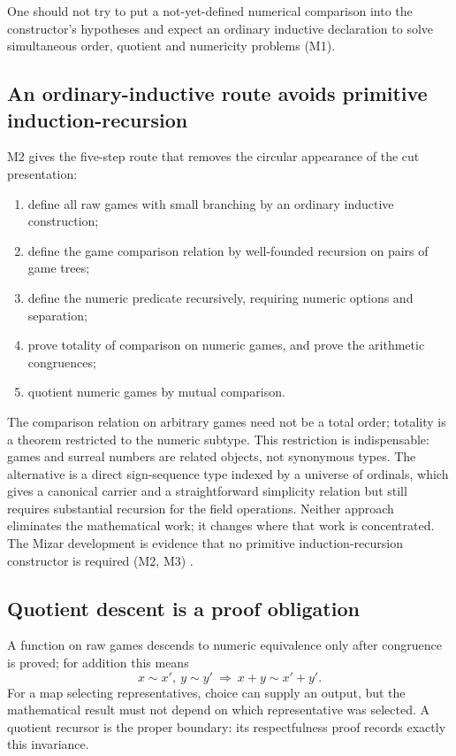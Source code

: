 \documentclass[11pt,letterpaper]{article}
\numberwithin{equation}{section}
\theoremstyle{definition}
\theoremstyle{remark}
\begin{document}
One should not try to put a not-yet-defined numerical comparison into the
constructor's hypotheses and expect an ordinary inductive declaration to solve
simultaneous order, quotient and numericity problems (M1).

\subsection{An ordinary-inductive route avoids primitive induction-recursion}
\label{found:sub:fivestep}
M2 gives the five-step route that removes the circular appearance of the cut
presentation:
\begin{enumerate}
\item define all raw games with small branching by an ordinary inductive
construction;
\item define the game comparison relation by well-founded recursion on pairs of
game trees;
\item define the numeric predicate recursively, requiring numeric options and
separation;
\item prove totality of comparison on numeric games, and prove the arithmetic
congruences;
\item quotient numeric games by mutual comparison.
\end{enumerate}
The comparison relation on arbitrary games need not be a total order; totality is
a theorem restricted to the numeric subtype. This restriction is indispensable:
games and surreal numbers are related objects, not synonymous types. The
alternative is a direct sign-sequence type indexed by a universe of ordinals,
which gives a canonical carrier and a straightforward simplicity relation but
still requires substantial recursion for the field operations. Neither approach
eliminates the mathematical work; it changes where that work is concentrated.
The Mizar development is evidence that no primitive induction-recursion
constructor is required (M2, M3) \cite{found:PakKaliszyk}.

\subsection{Quotient descent is a proof obligation}
\label{found:sub:quotient}
A function on raw games descends to numeric equivalence only after congruence is
proved; for addition this means
\[
 x\sim x',\ y\sim y'\ \Longrightarrow\ x+y\sim x'+y'.
\]
For a map selecting representatives, choice can supply an output, but the
mathematical result must not depend on which representative was selected. A
quotient recursor is the proper boundary: its respectfulness proof records
exactly this invariance.
\end{document}
